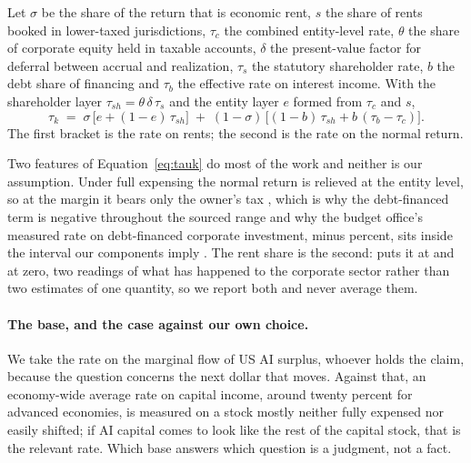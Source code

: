 \begin{definition}
\label{def:tauk}
Let $\sigma$ be the share of the return that is economic rent, $s$ the share of rents booked in
lower-taxed jurisdictions, $\tau_c$ the combined entity-level rate, $\theta$ the share of
corporate equity held in taxable accounts, $\delta$ the present-value factor for deferral between
accrual and realization, $\tau_s$ the statutory shareholder rate, $b$ the debt share of financing
and $\tau_b$ the effective rate on interest income. With the shareholder layer
$\tau_{sh} = \theta\,\delta\,\tau_s$ and the entity layer $e$ formed from $\tau_c$ and $s$,
\begin{equation}
\tau_k \;=\; \sigma\,\bigl[e + (1-e)\,\tau_{sh}\bigr]
\;+\;(1-\sigma)\,\bigl[(1-b)\,\tau_{sh} + b\,(\tau_b - \tau_c)\bigr].
\label{eq:tauk}
\end{equation}
The first bracket is the rate on rents; the second is the rate on the normal return.
\end{definition}

Two features of Equation~\eqref{eq:tauk} do most of the work and neither is our assumption.
Under full expensing the normal return is relieved at the entity level, so at the margin it bears
only the owner's tax \citep{AcemogluManeraRestrepo2020}, which is why the debt-financed term is
negative throughout the sourced range and why the budget office's measured rate on debt-financed
corporate investment, minus  percent, sits inside the interval our
components imply \citep{CBO2014}. The rent share is the second: \citet{Barkai2020} puts it at
 and \citet{KarabarbounisNeiman2014} at zero, two readings of what has happened
to the corporate sector rather than two estimates of one quantity, so we report both and never
average them.

\paragraph{The base, and the case against our own choice.} We take the rate on the marginal flow
of US AI surplus, whoever holds the claim, because the question concerns the next dollar that
moves. Against that, an economy-wide average rate on capital income, around twenty percent for
advanced economies, is measured on a stock mostly neither fully expensed nor easily shifted; if AI
capital comes to look like the rest of the capital stock, that is the relevant rate. Which base
answers which question is a judgment, not a fact.

